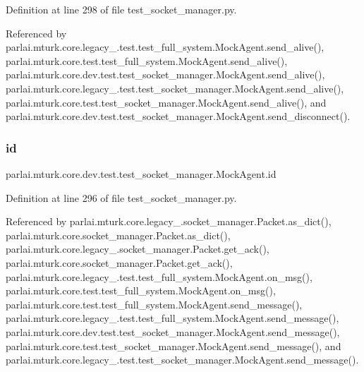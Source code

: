 Definition at line 298 of file test\+\_\+socket\+\_\+manager.\+py.



Referenced by parlai.\+mturk.\+core.\+legacy\+\_.\+test.\+test\+\_\+full\+\_\+system.\+Mock\+Agent.\+send\+\_\+alive(), parlai.\+mturk.\+core.\+test.\+test\+\_\+full\+\_\+system.\+Mock\+Agent.\+send\+\_\+alive(), parlai.\+mturk.\+core.\+dev.\+test.\+test\+\_\+socket\+\_\+manager.\+Mock\+Agent.\+send\+\_\+alive(), parlai.\+mturk.\+core.\+legacy\+\_.\+test.\+test\+\_\+socket\+\_\+manager.\+Mock\+Agent.\+send\+\_\+alive(), parlai.\+mturk.\+core.\+test.\+test\+\_\+socket\+\_\+manager.\+Mock\+Agent.\+send\+\_\+alive(), and parlai.\+mturk.\+core.\+dev.\+test.\+test\+\_\+socket\+\_\+manager.\+Mock\+Agent.\+send\+\_\+disconnect().

\mbox{\label{classparlai_1_1mturk_1_1core_1_1dev_1_1test_1_1test__socket__manager_1_1MockAgent_a0b8b022e8140e9251659ccabe9fcb33d}} 
\subsubsection{\texorpdfstring{id}{id}}
{\footnotesize\ttfamily parlai.\+mturk.\+core.\+dev.\+test.\+test\+\_\+socket\+\_\+manager.\+Mock\+Agent.\+id}



Definition at line 296 of file test\+\_\+socket\+\_\+manager.\+py.



Referenced by parlai.\+mturk.\+core.\+legacy\+\_.\+socket\+\_\+manager.\+Packet.\+as\+\_\+dict(), parlai.\+mturk.\+core.\+socket\+\_\+manager.\+Packet.\+as\+\_\+dict(), parlai.\+mturk.\+core.\+legacy\+\_.\+socket\+\_\+manager.\+Packet.\+get\+\_\+ack(), parlai.\+mturk.\+core.\+socket\+\_\+manager.\+Packet.\+get\+\_\+ack(), parlai.\+mturk.\+core.\+legacy\+\_.\+test.\+test\+\_\+full\+\_\+system.\+Mock\+Agent.\+on\+\_\+msg(), parlai.\+mturk.\+core.\+test.\+test\+\_\+full\+\_\+system.\+Mock\+Agent.\+on\+\_\+msg(), parlai.\+mturk.\+core.\+test.\+test\+\_\+full\+\_\+system.\+Mock\+Agent.\+send\+\_\+message(), parlai.\+mturk.\+core.\+legacy\+\_.\+test.\+test\+\_\+full\+\_\+system.\+Mock\+Agent.\+send\+\_\+message(), parlai.\+mturk.\+core.\+dev.\+test.\+test\+\_\+socket\+\_\+manager.\+Mock\+Agent.\+send\+\_\+message(), parlai.\+mturk.\+core.\+test.\+test\+\_\+socket\+\_\+manager.\+Mock\+Agent.\+send\+\_\+message(), and parlai.\+mturk.\+core.\+legacy\+\_.\+test.\+test\+\_\+socket\+\_\+manager.\+Mock\+Agent.\+send\+\_\+message().

